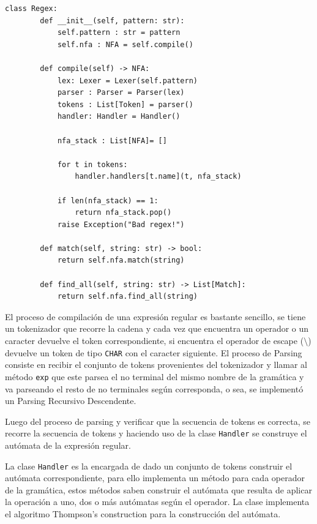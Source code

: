 \begin{verbatim}
class Regex:
        def __init__(self, pattern: str):
            self.pattern : str = pattern
            self.nfa : NFA = self.compile()
    
        def compile(self) -> NFA:
            lex: Lexer = Lexer(self.pattern)
            parser : Parser = Parser(lex)
            tokens : List[Token] = parser()
            handler: Handler = Handler()
            
            nfa_stack : List[NFA]= []
            
            for t in tokens:
                handler.handlers[t.name](t, nfa_stack)
            
            if len(nfa_stack) == 1:
                return nfa_stack.pop() 
            raise Exception("Bad regex!")
    
        def match(self, string: str) -> bool:
            return self.nfa.match(string)
    
        def find_all(self, string: str) -> List[Match]:
            return self.nfa.find_all(string)
\end{verbatim}

El proceso de compilación de una expresión regular es bastante sencillo, se tiene un tokenizador que recorre la cadena y cada vez que encuentra un operador o un caracter devuelve el token correspondiente, si encuentra el operador de escape ($\setminus$) devuelve un token de tipo \verb|CHAR| con el caracter siguiente. El proceso de Parsing consiste en recibir el conjunto de tokens provenientes del tokenizador y llamar al método \verb|exp| que este parsea el no terminal del mismo nombre de la gramática y va parseando el resto de no terminales según corresponda, o sea, se implementó un Parsing Recursivo Descendente.

Luego del proceso de parsing y verificar que la secuencia de tokens es correcta, se recorre la secuencia de tokens y haciendo uso de la clase \verb|Handler| se construye el autómata de la expresión regular. 

La clase \verb|Handler| es la encargada de dado un conjunto de tokens construir el autómata correspondiente, para ello implementa un método para cada operador de la gramática, estos métodos saben construir el autómata que resulta de aplicar la operación a uno, dos o más autómatas según el operador. La clase implementa el algoritmo Thompson's construction para la construcción del autómata.

